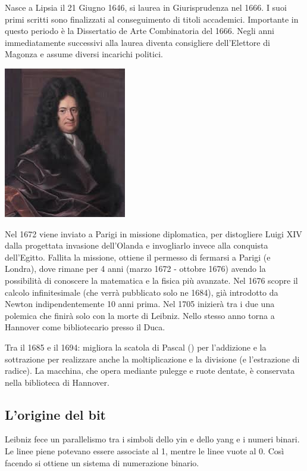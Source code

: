 Nasce a Lipsia il 21 Giugno 1646, si laurea in Giurisprudenza nel 1666.
I suoi primi scritti sono finalizzati al conseguimento di titoli accademici. Importante in
questo periodo è la Dissertatio de Arte Combinatoria del 1666.
Negli anni immediatamente successivi alla laurea diventa consigliere dell’Elettore di
Magonza e assume diversi incarichi politici.

\begin{center}
\includegraphics[scale = 0.7]{images/Leibniz.jpg}
\end{center}

Nel 1672 viene inviato a Parigi in missione diplomatica, per distogliere Luigi XIV dalla
progettata invasione dell’Olanda e invogliarlo invece alla conquista dell’Egitto.
Fallita la missione, ottiene il permesso di fermarsi a Parigi (e Londra), dove rimane per 4
anni (marzo 1672 - ottobre 1676) avendo la possibilità di conoscere la matematica e la
fisica più avanzate. Nel 1676 scopre il calcolo infinitesimale (che verrà pubblicato solo ne 1684), già
introdotto da Newton indipendentemente 10 anni prima. Nel 1705 inizierà tra i due una
polemica che finirà solo con la morte di Leibniz.
Nello stesso anno torna a Hannover come bibliotecario presso il Duca.

Tra il 1685 e il 1694: migliora la scatola di Pascal () per l’addizione e la sottrazione per realizzare
anche la moltiplicazione e la divisione (e l’estrazione di radice). La macchina, che opera
mediante pulegge e ruote dentate, è conservata nella biblioteca di Hannover.

\subsection{L'origine del bit}

Leibniz fece un parallelismo tra i simboli dello yin e dello yang e i numeri binari.
Le linee piene potevano essere associate al 1, mentre le linee vuote al 0.
Così facendo si ottiene un sistema di numerazione binario.

